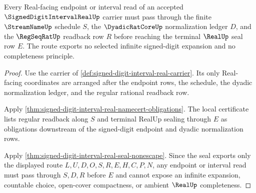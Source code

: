 \begin{theorem}
\label{thm:signed-digit-interval-real-regseqrat-seal}
Every Real-facing endpoint or interval read of an accepted $\SignedDigitIntervalRealUp$ carrier must pass through the finite $\StreamNameUp$ schedule $S$, the $\DyadicRatCoreUp$ normalization ledger $D$, and the $\RegSeqRatUp$ readback row $R$ before reaching the terminal $\RealUp$ seal row $E$. The route exports no selected infinite signed-digit expansion and no completeness principle.
\end{theorem}
\begin{proof}
Use the carrier of \autoref{def:signed-digit-interval-real-carrier}. Its only Real-facing coordinates are arranged after the endpoint rows, the schedule, the dyadic normalization ledger, and the regular rational readback row.

Apply \autoref{thm:signed-digit-interval-real-namecert-obligations}. The local certificate lists regular readback along $S$ and terminal RealUp sealing through $E$ as obligations downstream of the signed-digit endpoint and dyadic normalization rows.

Apply \autoref{thm:signed-digit-interval-real-seal-nonescape}. Since the seal exports only the displayed route $L,U,D,O,S,R,E,H,C,P,N$, any endpoint or interval read must pass through $S,D,R$ before $E$ and cannot expose an infinite expansion, countable choice, open-cover compactness, or ambient $\RealUp$ completeness.
\end{proof}


\begin{closurestatus}{\SignedDigitIntervalRealUp}
  \theoryclosure{\seedClosure}
  \formalstatus{\unformalizedV}
\end{closurestatus}
